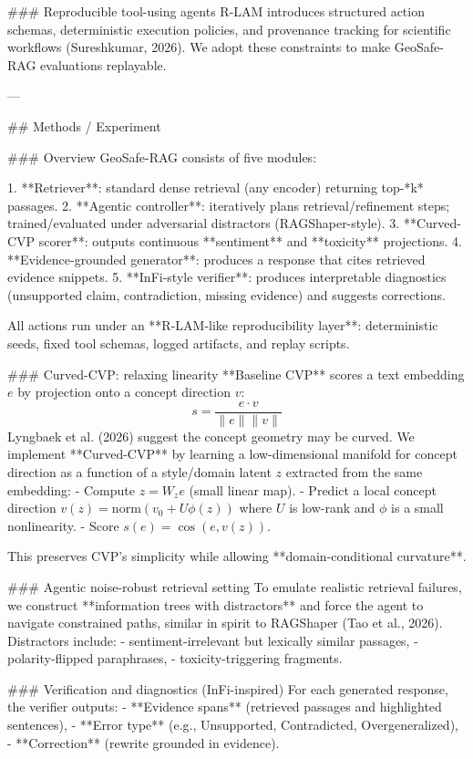 ### Reproducible tool-using agents
R-LAM introduces structured action schemas, deterministic execution policies, and provenance tracking for scientific workflows (Sureshkumar, 2026). We adopt these constraints to make GeoSafe-RAG evaluations replayable.

---

## Methods / Experiment

### Overview
GeoSafe-RAG consists of five modules:

1. **Retriever**: standard dense retrieval (any encoder) returning top-*k* passages.  
2. **Agentic controller**: iteratively plans retrieval/refinement steps; trained/evaluated under adversarial distractors (RAGShaper-style).  
3. **Curved-CVP scorer**: outputs continuous **sentiment** and **toxicity** projections.  
4. **Evidence-grounded generator**: produces a response that cites retrieved evidence snippets.  
5. **InFi-style verifier**: produces interpretable diagnostics (unsupported claim, contradiction, missing evidence) and suggests corrections.

All actions run under an **R-LAM-like reproducibility layer**: deterministic seeds, fixed tool schemas, logged artifacts, and replay scripts.

### Curved-CVP: relaxing linearity
**Baseline CVP** scores a text embedding \(e\) by projection onto a concept direction \(v\):  
\[
s = \frac{e \cdot v}{\|e\|\|v\|}
\]
Lyngbaek et al. (2026) suggest the concept geometry may be curved. We implement **Curved-CVP** by learning a low-dimensional manifold for concept direction as a function of a style/domain latent \(z\) extracted from the same embedding:
- Compute \(z = W_z e\) (small linear map).
- Predict a local concept direction \(v(z)= \mathrm{norm}(v_0 + U \phi(z))\) where \(U\) is low-rank and \(\phi\) is a small nonlinearity.
- Score \(s(e)=\cos(e, v(z))\).

This preserves CVP’s simplicity while allowing **domain-conditional curvature**.

### Agentic noise-robust retrieval setting
To emulate realistic retrieval failures, we construct **information trees with distractors** and force the agent to navigate constrained paths, similar in spirit to RAGShaper (Tao et al., 2026). Distractors include:
- sentiment-irrelevant but lexically similar passages,
- polarity-flipped paraphrases,
- toxicity-triggering fragments.

### Verification and diagnostics (InFi-inspired)
For each generated response, the verifier outputs:
- **Evidence spans** (retrieved passages and highlighted sentences),
- **Error type** (e.g., Unsupported, Contradicted, Overgeneralized),
- **Correction** (rewrite grounded in evidence).

